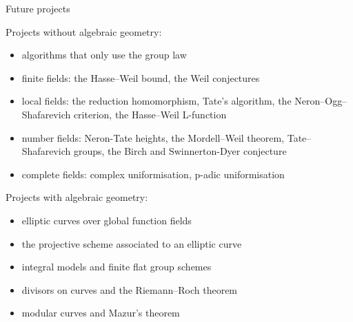 \documentclass[10pt]{beamer}
\begin{document}
\begin{frame}[t]{Future projects}

Projects without algebraic geometry:
\begin{itemize}
\item algorithms that only use the group law
\item finite fields: the Hasse--Weil bound, the Weil conjectures
\item local fields: the reduction homomorphism, Tate's algorithm, the Neron--Ogg--Shafarevich criterion, the Hasse--Weil L-function
\item number fields: Neron-Tate heights, the Mordell--Weil theorem, Tate--Shafarevich groups, the Birch and Swinnerton-Dyer conjecture
\item complete fields: complex uniformisation, p-adic uniformisation
\end{itemize}

Projects with algebraic geometry:
\begin{itemize}
\item elliptic curves over global function fields
\item the projective scheme associated to an elliptic curve
\item integral models and finite flat group schemes
\item divisors on curves and the Riemann--Roch theorem
\item modular curves and Mazur's theorem
\end{itemize}

\end{frame}
\end{document}
